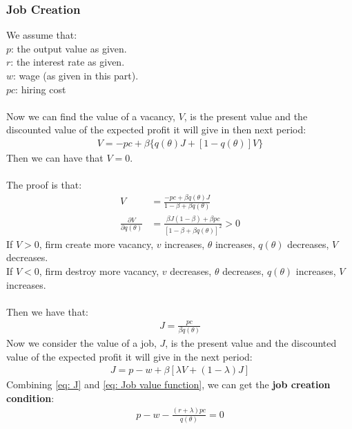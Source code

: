 \documentclass{article}
\begin{document}
\subsubsection{Job Creation}
We assume that:\\
\indent $p$: the output value as given.\\
\indent $r$: the interest rate as given.\\
\indent $w$: wage (as given in this part).\\
\indent $pc$: hiring cost\\\\
Now we can find the value of a vacancy, $V$, is the present value and the discounted value of the expected profit it will give in then next period:
\begin{align}
	V = -pc + \beta \{q(\theta) J + [1 - q(\theta)] V\} \label{eq: Vacancy value function}
\end{align}
Then we can have that $V = 0$.\\\\ 
The proof is that:
\begin{align*}
	V &= \frac{-pc + \beta q(\theta) J}{1 - \beta + \beta q(\theta)}\\
	\frac{\partial V}{\partial q(\theta)} &= \frac{\beta J (1 - \beta) + \beta pc}{[1 - \beta + \beta q(\theta)]^2} > 0
\end{align*}
\indent If $V > 0$, firm create more vacancy, $v$ increases, $\theta$ increases, $q(\theta)$ decreases, $V$ decreases.\\
\indent If $V < 0$, firm destroy more vacancy, $v$ decreases, $\theta$ decreases, $q(\theta)$ increases, $V$ increases.\\\\
Then we have that:
\begin{align}
	J = \frac{pc}{\beta q(\theta)} \label{eq: J}
\end{align}
Now we consider the value of a job, $J$, is the present value and the discounted value of the expected profit  it will give in the next period:
\begin{align}
	J = p - w + \beta [\lambda V + (1 - \lambda) J] \label{eq: Job value function}
\end{align}
Combining \eqref{eq: J} and \eqref{eq: Job value function}, we can get the \textbf{job creation condition}:
\begin{align*}
	p - w - \frac{(r + \lambda)pc}{q(\theta)} = 0
\end{align*}
\end{document}
